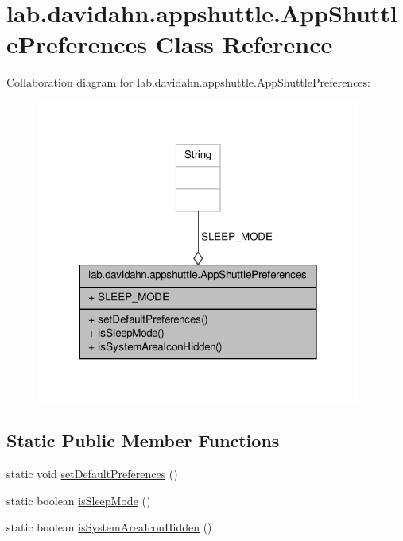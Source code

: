 \hypertarget{classlab_1_1davidahn_1_1appshuttle_1_1_app_shuttle_preferences}{\section{lab.\-davidahn.\-appshuttle.\-App\-Shuttle\-Preferences \-Class \-Reference}
\label{classlab_1_1davidahn_1_1appshuttle_1_1_app_shuttle_preferences}
}


\-Collaboration diagram for lab.\-davidahn.\-appshuttle.\-App\-Shuttle\-Preferences\-:
\nopagebreak
\begin{figure}[H]
\begin{center}
\leavevmode
\includegraphics[width=302pt]{classlab_1_1davidahn_1_1appshuttle_1_1_app_shuttle_preferences__coll__graph}
\end{center}
\end{figure}
\subsection*{\-Static \-Public \-Member \-Functions}
\begin{DoxyCompactItemize}
\item 
static void \hyperlink{classlab_1_1davidahn_1_1appshuttle_1_1_app_shuttle_preferences_a92b8a1f1c426d3069a4a968ed74c1828}{set\-Default\-Preferences} ()
\item 
static boolean \hyperlink{classlab_1_1davidahn_1_1appshuttle_1_1_app_shuttle_preferences_a07ab0e1e8db06bc359468d26054d678f}{is\-Sleep\-Mode} ()
\item 
static boolean \hyperlink{classlab_1_1davidahn_1_1appshuttle_1_1_app_shuttle_preferences_ae6f71518a4990c8ab1d44f07a2927cc1}{is\-System\-Area\-Icon\-Hidden} ()
\end{DoxyCompactItemize}
